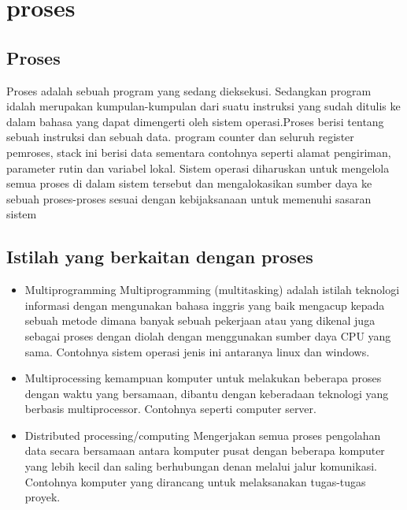 
\section{proses}

	\subsection{Proses}	
	Proses adalah sebuah  program yang sedang dieksekusi. Sedangkan program idalah merupakan kumpulan-kumpulan  dari suatu  instruksi yang sudah ditulis ke dalam bahasa yang dapat  dimengerti oleh sistem operasi.Proses berisi tentang sebuah instruksi dan sebuah data. program counter dan seluruh register pemroses, stack ini  berisi data sementara contohnya seperti alamat pengiriman, parameter rutin dan variabel lokal. Sistem operasi diharuskan untuk mengelola semua proses di dalam sistem tersebut dan mengalokasikan sumber daya ke sebuah  proses-proses sesuai dengan kebijaksanaan untuk memenuhi sasaran sistem
	
	\subsection{Istilah yang berkaitan dengan proses}
		\begin{itemize}
			\item Multiprogramming
			Multiprogramming (multitasking) adalah  istilah teknologi informasi dengan mengunakan bahasa inggris yang baik  mengacup kepada sebuah metode dimana banyak sebuah pekerjaan atau yang dikenal juga sebagai proses  dengan diolah dengan menggunakan sumber daya CPU yang sama.
			Contohnya sistem operasi jenis ini antaranya linux dan windows.
			\item Multiprocessing
			kemampuan komputer untuk melakukan beberapa proses dengan waktu yang bersamaan, dibantu dengan keberadaan teknologi yang berbasis multiprocessor.
			Contohnya seperti computer server.
			\item Distributed processing/computing
			Mengerjakan semua proses pengolahan data secara bersamaan antara komputer pusat dengan beberapa komputer yang lebih kecil dan saling berhubungan denan melalui jalur komunikasi.
			Contohnya komputer yang dirancang untuk melaksanakan tugas-tugas proyek.
		\end{itemize}
		
